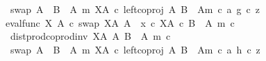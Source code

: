 \begin{isabellebody}
\ \ \ \ \ \ \ \ \ \ \ \ swap\ {\isacharparenleft}{\kern0pt}A\ {\isasymCoprod}\ {\isacharparenleft}{\kern0pt}B\ {\isasymsetminus}\ {\isacharparenleft}{\kern0pt}A{\isacharcomma}{\kern0pt}\ m{\isacharparenright}{\kern0pt}{\isacharparenright}{\kern0pt}{\isacharparenright}{\kern0pt}\ {\isacharparenleft}{\kern0pt}X\isactrlbsup A\isactrlesup {\isacharparenright}{\kern0pt}\ {\isasymcirc}\isactrlsub c\ {\isasymlangle}left{\isacharunderscore}{\kern0pt}coproj\ A\ {\isacharparenleft}{\kern0pt}B\ {\isasymsetminus}\ {\isacharparenleft}{\kern0pt}A{\isacharcomma}{\kern0pt}m{\isacharparenright}{\kern0pt}{\isacharparenright}{\kern0pt}\ {\isasymcirc}\isactrlsub c\ a{\isacharcomma}{\kern0pt}\ g\ {\isasymcirc}\isactrlsub c\ z{\isasymrangle}\isanewline
\ \ \ \ \ \ \ \ \ \ {\isacharequal}{\kern0pt}\ {\isacharparenleft}{\kern0pt}eval{\isacharunderscore}{\kern0pt}func\ X\ A\ {\isasymcirc}\isactrlsub c\ swap\ {\isacharparenleft}{\kern0pt}X\isactrlbsup A\isactrlesup {\isacharparenright}{\kern0pt}\ A{\isacharparenright}{\kern0pt}\ {\isasymamalg}\ {\isacharparenleft}{\kern0pt}x\ {\isasymcirc}\isactrlsub c\ {\isasymbeta}\isactrlbsub X\isactrlbsup A\isactrlesup \ {\isasymtimes}\isactrlsub c\ {\isacharparenleft}{\kern0pt}B\ {\isasymsetminus}\ {\isacharparenleft}{\kern0pt}A{\isacharcomma}{\kern0pt}\ m{\isacharparenright}{\kern0pt}{\isacharparenright}{\kern0pt}\isactrlesub {\isacharparenright}{\kern0pt}\ {\isasymcirc}\isactrlsub c\isanewline
\ \ \ \ \ \ \ \ \ \ \ \ dist{\isacharunderscore}{\kern0pt}prod{\isacharunderscore}{\kern0pt}coprod{\isacharunderscore}{\kern0pt}inv\ {\isacharparenleft}{\kern0pt}X\isactrlbsup A\isactrlesup {\isacharparenright}{\kern0pt}\ A\ {\isacharparenleft}{\kern0pt}B\ {\isasymsetminus}\ {\isacharparenleft}{\kern0pt}A{\isacharcomma}{\kern0pt}\ m{\isacharparenright}{\kern0pt}{\isacharparenright}{\kern0pt}\ {\isasymcirc}\isactrlsub c\isanewline
\ \ \ \ \ \ \ \ \ \ \ \ swap\ {\isacharparenleft}{\kern0pt}A\ {\isasymCoprod}\ {\isacharparenleft}{\kern0pt}B\ {\isasymsetminus}\ {\isacharparenleft}{\kern0pt}A{\isacharcomma}{\kern0pt}\ m{\isacharparenright}{\kern0pt}{\isacharparenright}{\kern0pt}{\isacharparenright}{\kern0pt}\ {\isacharparenleft}{\kern0pt}X\isactrlbsup A\isactrlesup {\isacharparenright}{\kern0pt}\ {\isasymcirc}\isactrlsub c\ {\isasymlangle}left{\isacharunderscore}{\kern0pt}coproj\ A\ {\isacharparenleft}{\kern0pt}B\ {\isasymsetminus}\ {\isacharparenleft}{\kern0pt}A{\isacharcomma}{\kern0pt}m{\isacharparenright}{\kern0pt}{\isacharparenright}{\kern0pt}\ {\isasymcirc}\isactrlsub c\ a{\isacharcomma}{\kern0pt}\ h\ {\isasymcirc}\isactrlsub c\ z{\isasymrangle}{\isachardoublequoteclose}\isanewline

\end{isabellebody}
